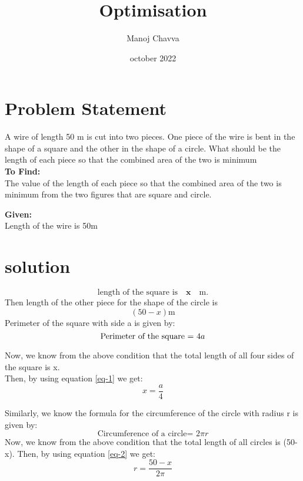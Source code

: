 \documentclass[journal,12pt,twocolumn]{IEEEtran}
\title{Optimisation}
\author{Manoj Chavva}
\date{october 2022}
\let\vec\mathbf
\begin{document}
\maketitle
\section{Problem Statement}

\noindent A wire of length 50 m is cut into two pieces. One piece of the wire is bent in the shape of a square and the other in the shape of a circle. What should be the length of each piece so that the combined area of the two is minimum \\

\noindent \textbf{To Find:} \\
The value of the length of each piece so that the combined area of the two is minimum from the two figures that are square and circle.

\noindent \textbf{Given:} \\
Length of the wire is 50m
\section{solution}
\begin{equation}
\text{length of the square is} \quad \vec{x} \quad \text{m} .
\end{equation} 
Then length of the other piece for the shape of the circle is \begin{equation}
(50-x) \text{m}
\end{equation} 
Perimeter of the square with side a is given by: \\
\begin{equation}
\text{Perimeter of the square = } 4a \\
\label{eq-1}
\end{equation}

Now, we know from the above condition that the total length of all four sides of the square is x.\\

Then, by using equation \ref{eq-1} we get:
\begin{equation}
x = \frac{a}{4}
\end{equation}

Similarly, we know the formula for the circumference of the circle with radius r is given by:
\begin{equation}
\text{Circumference of a circle= }2\pi r
\label{eq-2}
\end{equation} 
Now, we know from the above condition that the total length of all circles is (50-x).
Then, by using equation \ref{eq-2} we get:
\begin{equation}
r=\frac{50-x}{2\pi}
\end{equation}
\end{document}
